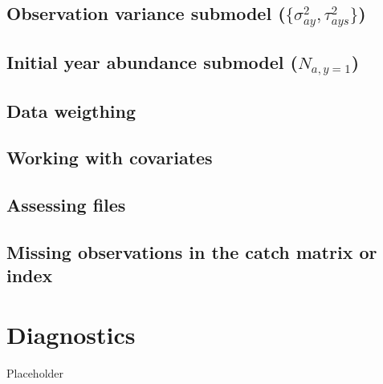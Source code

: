 \documentclass[
]{book}
\begin{document}
\hypertarget{observation-variance-submodel-sigma2_ay-tau2_ays}{%
\section{\texorpdfstring{Observation variance submodel (\(\{\sigma^2_{ay}, \tau^2_{ays}\}\))}{Observation variance submodel (\textbackslash\{\textbackslash sigma\^{}2\_\{ay\}, \textbackslash tau\^{}2\_\{ays\}\textbackslash\})}}\label{observation-variance-submodel-sigma2_ay-tau2_ays}}

\hypertarget{initial-year-abundance-submodel-n_ay1}{%
\section{\texorpdfstring{Initial year abundance submodel (\(N_{a,y=1}\))}{Initial year abundance submodel (N\_\{a,y=1\})}}\label{initial-year-abundance-submodel-n_ay1}}

\hypertarget{data-weigthing}{%
\section{Data weigthing}\label{data-weigthing}}

\hypertarget{working-with-covariates}{%
\section{Working with covariates}\label{working-with-covariates}}

\hypertarget{assessing-files}{%
\section{\texorpdfstring{Assessing \ADMB files}{Assessing files}}\label{assessing-files}}

\hypertarget{missing-observations-in-the-catch-matrix-or-index}{%
\section{Missing observations in the catch matrix or index}\label{missing-observations-in-the-catch-matrix-or-index}}

\hypertarget{diagnostics}{%
\chapter{\texorpdfstring{Diagnostics \label{sec:diagn}}{Diagnostics }}\label{diagnostics}}

Placeholder
\end{document}
